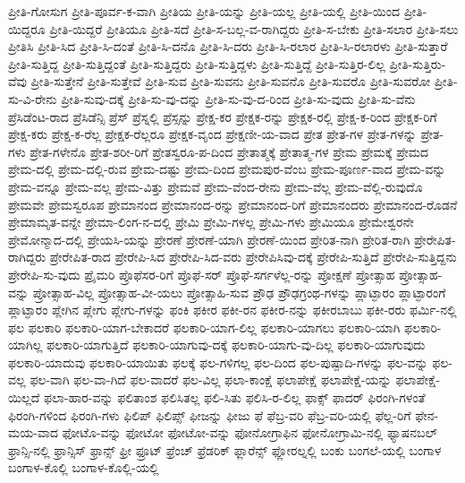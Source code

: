 {ಪ್ರೀತಿ-ಗೋಸುಗ
ಪ್ರೀತಿ-ಪೂರ್ವ-ಕ-ವಾಗಿ
ಪ್ರೀತಿಯ
ಪ್ರೀತಿ-ಯನ್ನು
ಪ್ರೀತಿ-ಯಲ್ಲ
ಪ್ರೀತಿ-ಯಲ್ಲಿ
ಪ್ರೀತಿ-ಯಿಂದ
ಪ್ರೀತಿ-ಯಿದ್ದರೂ
ಪ್ರೀತಿ-ಯಿದ್ದರೆ
ಪ್ರೀತಿಯೂ
ಪ್ರೀತಿ-ಸದೆ
ಪ್ರೀತಿ-ಸ-ಬಲ್ಲ-ವ-ರಾಗಿದ್ದರು
ಪ್ರೀತಿ-ಸ-ಬೇಕು
ಪ್ರೀತಿ-ಸಲಾರ
ಪ್ರೀತಿ-ಸಲು
ಪ್ರೀತಿಸಿ
ಪ್ರೀತಿ-ಸಿದ
ಪ್ರೀತಿ-ಸಿ-ದಂತೆ
ಪ್ರೀತಿ-ಸಿ-ದನೊ
ಪ್ರೀತಿ-ಸಿ-ದರು
ಪ್ರೀತಿ-ಸಿ-ರಲಾರ
ಪ್ರೀತಿ-ಸಿ-ರಲಾರಳು
ಪ್ರೀತಿ-ಸುತ್ತಾರೆ
ಪ್ರೀತಿ-ಸುತ್ತಿದ್ದ
ಪ್ರೀತಿ-ಸುತ್ತಿದ್ದಂತೆ
ಪ್ರೀತಿ-ಸುತ್ತಿದ್ದರು
ಪ್ರೀತಿ-ಸುತ್ತಿದ್ದಳು
ಪ್ರೀತಿ-ಸುತ್ತಿದ್ದೆ
ಪ್ರೀತಿ-ಸುತ್ತಿರ-ಲಿಲ್ಲ
ಪ್ರೀತಿ-ಸುತ್ತಿರು-ವೆವು
ಪ್ರೀತಿ-ಸುತ್ತೇನೆ
ಪ್ರೀತಿ-ಸುತ್ತೇವೆ
ಪ್ರೀತಿ-ಸುವ
ಪ್ರೀತಿ-ಸುವನು
ಪ್ರೀತಿ-ಸುವನೊ
ಪ್ರೀತಿ-ಸುವರೊ
ಪ್ರೀತಿ-ಸುವರೋ
ಪ್ರೀತಿ-ಸು-ವಿ-ರೇನು
ಪ್ರೀತಿ-ಸುವು-ದಕ್ಕೆ
ಪ್ರೀತಿ-ಸು-ವು-ದನ್ನು
ಪ್ರೀತಿ-ಸು-ವು-ದ-ರಿಂದ
ಪ್ರೀತಿ-ಸು-ವುದು
ಪ್ರೀತಿ-ಸು-ವೆನು
ಪ್ರೆಸಿಡೆಂಟ-ರಾದ
ಪ್ರೆಸಿಡೆನ್ಸಿ
ಪ್ರೆಸ್
ಪ್ರೆಸ್ನಲ್ಲಿ
ಪ್ರೆಸ್ಸನ್ನು
ಪ್ರೇಕ್ಷ-ಕರ
ಪ್ರೇಕ್ಷಕ-ರನ್ನು
ಪ್ರೇಕ್ಷಕ-ರಲ್ಲಿ
ಪ್ರೇಕ್ಷ-ಕ-ರಿಂದ
ಪ್ರೇಕ್ಷಕ-ರಿಗೆ
ಪ್ರೇಕ್ಷ-ಕರು
ಪ್ರೇಕ್ಷ-ಕ-ರೆಲ್ಲ
ಪ್ರೇಕ್ಷಕ-ರೆಲ್ಲರೂ
ಪ್ರೇಕ್ಷಕ-ವೃಂದ
ಪ್ರೇಕ್ಷಣೀ-ಯ-ವಾದ
ಪ್ರೇತ
ಪ್ರೇತ-ಗಳ
ಪ್ರೇತ-ಗಳನ್ನು
ಪ್ರೇತ-ಗಳು
ಪ್ರೇತ-ಗಳೇನೊ
ಪ್ರೇತ-ಶರೀ-ರಿಗೆ
ಪ್ರೇತಸ್ವರೂ-ಪ-ದಿಂದ
ಪ್ರೇತಾತ್ಮಕ್ಕೆ
ಪ್ರೇತಾತ್ಮ-ಗಳ
ಪ್ರೇಮ
ಪ್ರೇಮಕ್ಕೆ
ಪ್ರೇಮದ
ಪ್ರೇಮ-ದಲ್ಲಿ
ಪ್ರೇಮ-ದಲ್ಲಿ-ರುವ
ಪ್ರೇಮ-ದಷ್ಟು
ಪ್ರೇಮ-ದಿಂದ
ಪ್ರೇಮಪುರ-ವೆಂಬ
ಪ್ರೇಮ-ಪೂರ್ಣ-ವಾದ
ಪ್ರೇಮ-ವನ್ನು
ಪ್ರೇಮ-ವನ್ನೂ
ಪ್ರೇಮ-ವಲ್ಲ
ಪ್ರೇಮ-ವಿತ್ತು
ಪ್ರೇಮವೆ
ಪ್ರೇಮ-ವೆಂದ-ರೇನು
ಪ್ರೇಮ-ವೆಲ್ಲ
ಪ್ರೇಮ-ವೆಲ್ಲಿ-ರುವುದೊ
ಪ್ರೇಮವೇ
ಪ್ರೇಮಸ್ವರೂಪ
ಪ್ರೇಮಾನಂದ
ಪ್ರೇಮಾನಂದ-ರನ್ನು
ಪ್ರೇಮಾನಂದ-ರಿಗೆ
ಪ್ರೇಮಾನಂದರು
ಪ್ರೇಮಾನಂದ-ರೊಡನೆ
ಪ್ರೇಮಾಮೃತ-ವನ್ನೇ
ಪ್ರೇಮಾ-ಲಿಂಗ-ನ-ದಲ್ಲಿ
ಪ್ರೇಮಿ
ಪ್ರೇಮಿ-ಗಳಲ್ಲ
ಪ್ರೇಮಿ-ಗಳು
ಪ್ರೇಮಿಯೂ
ಪ್ರೇಮೇಶ್ವರನೇ
ಪ್ರೇಮೋನ್ಮಾದ-ದಲ್ಲಿ
ಪ್ರೇಯಸಿ-ಯನ್ನು
ಪ್ರೇರಣೆ
ಪ್ರೇರಣೆ-ಯಾಗಿ
ಪ್ರೇರಣೆ-ಯಿಂದ
ಪ್ರೇರಿತ-ನಾಗಿ
ಪ್ರೇರಿತ-ರಾಗಿ
ಪ್ರೇರೇಪಿತ-ರಾಗಿದ್ದರು
ಪ್ರೇರೇಪಿತ-ರಾದ
ಪ್ರೇರೇಪಿ-ಸಿದ
ಪ್ರೇರೇಪಿ-ಸಿದ-ವರು
ಪ್ರೇರೇಪಿಸಿವು-ದಕ್ಕೆ
ಪ್ರೇರೇಪಿ-ಸುತ್ತಿದೆ
ಪ್ರೇರೇಪಿ-ಸುತ್ತಿದ್ದನು
ಪ್ರೇರೇಪಿ-ಸು-ವುದು
ಪ್ರೈಮರಿ
ಪ್ರೊಫೆಸರ-ರಿಗೆ
ಪ್ರೊಫೆ-ಸರ್
ಪ್ರೊಫೆ-ಸರ್ಗಳೆಲ್ಲ-ರನ್ನು
ಪ್ರೋಕ್ಷಣೆ
ಪ್ರೋತ್ಸಾಹ
ಪ್ರೋತ್ಸಾಹ-ವನ್ನು
ಪ್ರೋತ್ಸಾಹ-ವಿಲ್ಲ
ಪ್ರೋತ್ಸಾಹ-ವೀ-ಯಲು
ಪ್ರೋತ್ಸಾಹಿ-ಸುವ
ಪ್ರೌಢ
ಪ್ರೌಢಗ್ರಂಥ-ಗಳನ್ನು
ಪ್ಲಾಟ್ಫಾರಂ
ಪ್ಲಾಟ್ಫಾರಂಗೆ
ಪ್ಲಾಟ್ಫಾರಂ
ಪ್ಲೇಗಿನ
ಪ್ಲೇಗು
ಪ್ಲೇಗು-ಗಳನ್ನು
ಫಂಕಿ
ಫಕೀರ
ಫಕೀ-ರನ
ಫಕೀರ-ನನ್ನು
ಫಕೀರಬಾಬು
ಫಕೀ-ರರು
ಫರ್ಮಿ-ನಲ್ಲಿ
ಫಲ
ಫಲಕಾರಿ
ಫಲಕಾರಿ-ಯಾಗ-ಬೇಕಾದರೆ
ಫಲಕಾರಿ-ಯಾಗ-ಲಿಲ್ಲ
ಫಲಕಾರಿ-ಯಾಗಲು
ಫಲಕಾರಿ-ಯಾಗಿ
ಫಲಕಾರಿ-ಯಾಗಿಲ್ಲ
ಫಲಕಾರಿ-ಯಾಗುತ್ತಿದೆ
ಫಲಕಾರಿ-ಯಾಗುವು-ದಕ್ಕೆ
ಫಲಕಾರಿ-ಯಾಗು-ವು-ದಿಲ್ಲ
ಫಲಕಾರಿ-ಯಾಗುವುದು
ಫಲಕಾರಿ-ಯಾದುವು
ಫಲಕಾರಿ-ಯಾಯಿತು
ಫಲಕ್ಕೆ
ಫಲ-ಗಳಿಗಲ್ಲ
ಫಲ-ದಿಂದ
ಫಲ-ಪುಷ್ಪಾದಿ-ಗಳನ್ನು
ಫಲ-ವನ್ನು
ಫಲ-ವಲ್ಲ
ಫಲ-ವಾಗಿ
ಫಲ-ವಾ-ಗಿದೆ
ಫಲ-ವಾದರೆ
ಫಲ-ವಿಲ್ಲ
ಫಲಾ-ಕಾಂಕ್ಷೆ
ಫಲಾಪೇಕ್ಷೆ
ಫಲಾಪೇಕ್ಷೆ-ಯನ್ನು
ಫಲಾಪೇಕ್ಷೆ-ಯಿಲ್ಲದೆ
ಫಲಾ-ಹಾರ-ವನ್ನು
ಫಲಿತಾಂಶ
ಫಲಿಸಿತಲ್ಲ
ಫಲಿ-ಸಿತು
ಫಲಿಸಿ-ರ-ಲಿಲ್ಲ
ಫಾಕ್ಸ್
ಫಾದರ್
ಫಿರಂಗಿ-ಗಳಂತೆ
ಫಿರಂಗಿ-ಗಳಿಂದ
ಫಿರಂಗಿ-ಗಳು
ಫಿಲಿಪ್
ಫಿಲಿಪ್ಸ್
ಫೀಜನ್ನು
ಫೀಜು
ಫೆ
ಫೆಬ್ರ-ವರಿ
ಫೆಬ್ರ-ವರಿ-ಯಲ್ಲಿ
ಫೆಲ್ಲ-ರಿಗೆ
ಫೇನ-ಮಯ-ವಾದ
ಫೋಟೊ-ವನ್ನು
ಫೋಟೋ
ಫೋಟೋ-ವನ್ನು
ಫೋನೋಗ್ರಾಫಿನ
ಫೋನೋಗ್ರಾಮಿ-ನಲ್ಲಿ
ಫ್ಯಾಷನಬಲ್
ಫ್ರಾನ್ಸಿ-ನಲ್ಲಿ
ಫ್ರಾನ್ಸಿಸ್
ಫ್ರಾನ್ಸ್
ಫ್ರೀ
ಫ್ರೂಟ್
ಫ್ರೆಂಚ್
ಫ್ರೆಡರಿಕ್
ಫ್ಲಾರೆನ್ಸ್
ಫ್ಲೋರಲ್ನಲ್ಲಿ
ಬಂಕು
ಬಂಗಲೆ-ಯಲ್ಲಿ
ಬಂಗಾಳ
ಬಂಗಾಳ-ಕೊಲ್ಲಿ
ಬಂಗಾಳ-ಕೊಲ್ಲಿ-ಯಲ್ಲಿ
}
